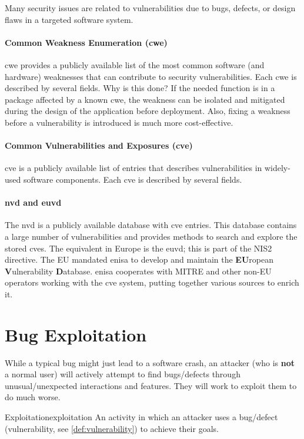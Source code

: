 Many security issues are related to vulnerabilities due to bugs, defects, or design flaws in a targeted software system.

\paragraph{Common Weakness Enumeration (\gls{cwe})}
\gls{cwe} provides a publicly available list of the most common software (and hardware) weaknesses that can contribute to security vulnerabilities. Each \gls{cwe} is described by several fields. Why is this done? If the needed function is in a package affected by a known \gls{cwe}, the weakness can be isolated and mitigated during the design of the application before deployment. Also, fixing a weakness before a vulnerability is introduced is much more cost-effective. 

\paragraph{Common Vulnerabilities and Exposures (\gls{cve})}
\gls{cve} is a publicly available list of entries that describes vulnerabilities in widely-used software components. Each \gls{cve} is described by several fields.

\paragraph{\gls{nvd} and \gls{euvd}} 
The \gls{nvd} is a publicly available database with \gls{cve} entries. This database contains a large number of vulnerabilities and provides methods to search and explore the stored \glspl{cve}. The equivalent in Europe is the \gls{euvd}; this is part of the NIS2 directive. The EU mandated \gls{enisa} to develop and maintain the \textbf{EU}ropean \textbf{V}ulnerability \textbf{D}atabase. \gls{enisa} cooperates with MITRE and other non-EU operators working with the \gls{cve} system, putting together various sources to enrich it.

\section{Bug Exploitation}
While a typical bug might just lead to a software crash, an attacker (who is \textbf{not} a normal user) will actively attempt to find bugs/defects through unusual/unexpected interactions and features. They will work to exploit them to do much worse.

\begin{definition}{Exploitation}{exploitation}
    An activity in which an attacker uses a bug/defect (vulnerability, see \cref{def:vulnerability}) to achieve their goals.
\end{definition}

